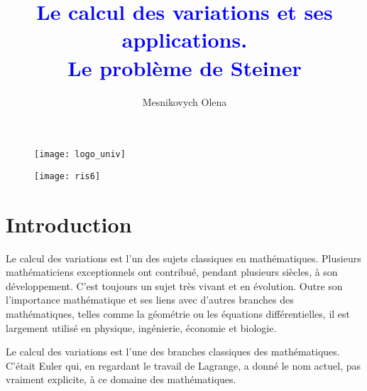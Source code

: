 \documentclass[10pt,a4paper]{article}%
\title{\textcolor{blue}{\textbf{Le calcul des variations et ses applications. \\Le problème de Steiner}}}
\author{Mesnikovych Olena}
\theoremstyle{theorem}
\theoremstyle{definition}
\begin{document}
\begin{figure}
	\begin{minipage}[H]{0.2\linewidth}
		\texttt{[image: logo\_univ]}
	\end{minipage}
	\hfill
	\begin{minipage}[H]{0.2\linewidth}
		\texttt{[image: ris6]}
	\end{minipage}
	
	
\end{figure}

\maketitle


\thispagestyle{empty}

\newpage
\thispagestyle{empty}
\tableofcontents

\newpage


	\section{Introduction}
	
	
	
	Le calcul des variations est l'un des sujets classiques en mathématiques.
	Plusieurs mathématiciens exceptionnels ont contribué, pendant plusieurs siècles, à son développement. C'est toujours un sujet très vivant et en évolution. Outre son
	l'importance mathématique et ses liens avec d'autres branches des mathématiques, telles comme la géométrie ou les équations différentielles, il est largement utilisé en physique, ingénierie, économie et biologie.
	
	Le calcul des variations est l'une des branches classiques des mathématiques. C'était Euler qui, en regardant le travail de Lagrange, a donné le nom actuel, pas vraiment explicite, à ce domaine des mathématiques\cite{istmath90}.
	
\end{document}
